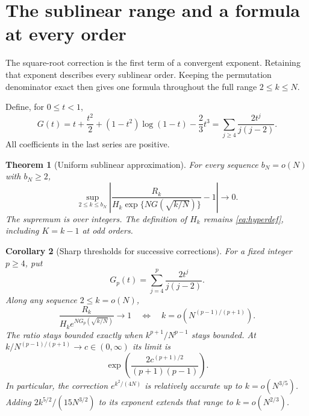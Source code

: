\documentclass[11pt]{article}
\newtheorem{theorem}{Theorem}[section]
\newtheorem{corollary}[theorem]{Corollary}
\theoremstyle{definition}
\theoremstyle{remark}
\newcommand{\1}{\mathbf 1}
\begin{document}

\section{The sublinear range and a formula at every order}\label{sec:asymptotics}

The square-root correction is the first term of a convergent exponent. Retaining that exponent describes every sublinear order. Keeping the permutation denominator exact then gives one formula throughout the full range $2\le k\le N$.

Define, for $0\le t<1$,
\begin{equation}\label{eq:actionG}
G(t)=t+\frac{t^2}{2}+(1-t^2)\log(1-t)-\frac23t^3
=\sum_{j\ge4}\frac{2t^j}{j(j-2)}.
\end{equation}
All coefficients in the last series are positive.

\begin{theorem}[Uniform sublinear approximation]\label{thm:sublinear}
For every sequence $b_N=o(N)$ with $b_N\ge2$,
\begin{equation}\label{eq:sublinear}
\sup_{2\le k\le b_N}
\left|\frac{R_k}{H_k\exp\{NG(\sqrt{k/N})\}}-1\right|
\longrightarrow0.
\end{equation}
The supremum is over integers. The definition of $H_k$ remains \eqref{eq:hyperdef}, including $K=k-1$ at odd orders.
\end{theorem}

\begin{corollary}[Sharp thresholds for successive corrections]\label{cor:hierarchy}
For a fixed integer $p\ge4$, put
\[
G_p(t)=\sum_{j=4}^{p}\frac{2t^j}{j(j-2)}.
\]
Along any sequence $2\le k=o(N)$,
\begin{equation}\label{eq:hierarchy}
\frac{R_k}{H_ke^{NG_p(\sqrt{k/N})}}\longrightarrow1
\quad\Longleftrightarrow\quad
k=o\left(N^{(p-1)/(p+1)}\right).
\end{equation}
The ratio stays bounded exactly when $k^{p+1}/N^{p-1}$ stays bounded. At $k/N^{(p-1)/(p+1)}\to c\in(0,\infty)$ its limit is
\begin{equation}\label{eq:hierarchyboundary}
\exp\left(\frac{2c^{(p+1)/2}}{(p+1)(p-1)}\right).
\end{equation}
In particular, the correction $e^{k^2/(4N)}$ is relatively accurate up to $k=o(N^{3/5})$. Adding $2k^{5/2}/(15N^{3/2})$ to its exponent extends that range to $k=o(N^{2/3})$.
\end{corollary}
\end{document}
